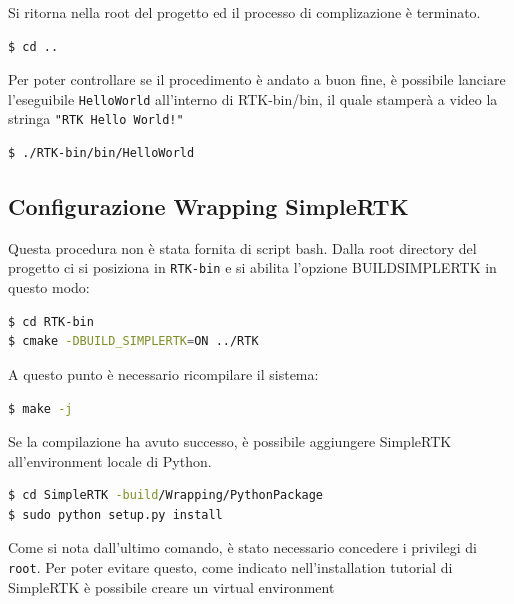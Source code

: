 \documentclass[a4paper,12pt, doubleside]{report}
\begin{document}
                    Si ritorna nella root del progetto ed il processo di complizazione è terminato.
                    \begin{lstlisting}[language=bash, frame=bt]
$ cd ..
                    \end{lstlisting}
                    
                    Per poter controllare se il procedimento è andato a buon fine, è possibile lanciare l'eseguibile \texttt{HelloWorld} all'interno di RTK-bin/bin, il quale stamperà a video la stringa \texttt{"RTK Hello World!"}
                    \begin{lstlisting}[language=bash, frame=bt]
$ ./RTK-bin/bin/HelloWorld
                    \end{lstlisting}
                    
            \subsection{Configurazione Wrapping SimpleRTK}
                \par
                    Questa procedura non è stata fornita di script bash. Dalla root directory del progetto ci si posiziona in \texttt{RTK-bin} e si abilita l'opzione BUILD\textunderscore SIMPLERTK in questo modo:
                    \begin{lstlisting}[language=bash, frame=bt]
$ cd RTK-bin
$ cmake -DBUILD_SIMPLERTK=ON ../RTK
                    \end{lstlisting}
                    
                    A questo punto è necessario ricompilare il sistema:
                    \begin{lstlisting}[language=bash, frame=bt]
$ make -j
                    \end{lstlisting}
                    
                    Se la compilazione ha avuto successo, è possibile aggiungere SimpleRTK all'environment locale di Python.
                    \begin{lstlisting}[language=bash, frame=bt]
$ cd SimpleRTK -build/Wrapping/PythonPackage
$ sudo python setup.py install
                    \end{lstlisting}
                    Come si nota dall'ultimo comando, è stato necessario concedere i privilegi di \texttt{root}. Per poter evitare questo, come indicato nell'installation tutorial di SimpleRTK è possibile creare un virtual environment\cite{simplertk-wiki}
               
\end{document}
